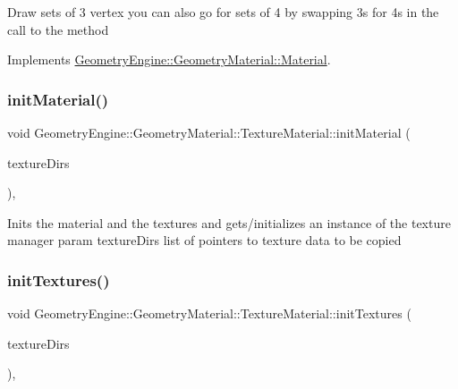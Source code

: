 Draw sets of 3 vertex you can also go for sets of 4 by swapping 3s for 4s in the call to the method 

Implements \mbox{\hyperlink{class_geometry_engine_1_1_geometry_material_1_1_material_a0070eab6e5fe86dc05dc69f2e37b9072}{Geometry\+Engine\+::\+Geometry\+Material\+::\+Material}}.

\mbox{\label{class_geometry_engine_1_1_geometry_material_1_1_texture_material_afbf7007e9d869b23dfbc173841ba5b34}} 
\subsubsection{\texorpdfstring{initMaterial()}{initMaterial()}}
{\footnotesize\ttfamily void Geometry\+Engine\+::\+Geometry\+Material\+::\+Texture\+Material\+::init\+Material (\begin{DoxyParamCaption}\item[{const std\+::list$<$ \mbox{\hyperlink{class_geometry_engine_1_1_geometry_material_1_1_texture_parameters}{Texture\+Parameters}} $\ast$ $>$ \&}]{texture\+Dirs }\end{DoxyParamCaption})\hspace{0.3cm}{\ttfamily [protected]}, {\ttfamily [virtual]}}

Inits the material and the textures and gets/initializes an instance of the texture manager param texture\+Dirs list of pointers to texture data to be copied \mbox{\label{class_geometry_engine_1_1_geometry_material_1_1_texture_material_ae2a34b3c00d6aecd9bdc686042cdf892}} 
\subsubsection{\texorpdfstring{initTextures()}{initTextures()}}
{\footnotesize\ttfamily void Geometry\+Engine\+::\+Geometry\+Material\+::\+Texture\+Material\+::init\+Textures (\begin{DoxyParamCaption}\item[{const std\+::list$<$ \mbox{\hyperlink{class_geometry_engine_1_1_geometry_material_1_1_texture_parameters}{Texture\+Parameters}} $\ast$ $>$ \&}]{texture\+Dirs }\end{DoxyParamCaption})\hspace{0.3cm}{\ttfamily [protected]}, {\ttfamily [virtual]}}

